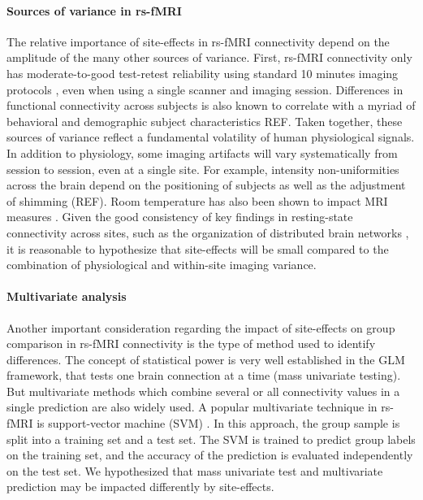 \documentclass[authoryear]{elsarticle}
\begin{document}
\paragraph{Sources of variance in rs-fMRI}
The relative importance of site-effects in rs-fMRI connectivity depend on the amplitude of the many other sources of variance. First, rs-fMRI connectivity only has moderate-to-good test-retest reliability using standard 10 minutes imaging protocols \citep{Shehzad2009}, even when using a single scanner and imaging session. Differences in functional connectivity across subjects is also known to correlate with a myriad of behavioral and demographic subject characteristics REF. Taken together, these sources of variance reflect a fundamental volatility of human physiological signals. In addition to physiology, some imaging artifacts will vary systematically from session to session, even at a single site. For example, intensity non-uniformities across the brain depend on the positioning of subjects as well as the adjustment of shimming (REF). Room temperature has also been shown to impact MRI measures \citep{Vanhoutte2006}. Given the good consistency of key findings in resting-state connectivity across sites, such as the organization of distributed brain networks \citep{Biswal2010}, it is reasonable to hypothesize that site-effects will be small compared to the combination of physiological and within-site imaging variance.

\paragraph{Multivariate analysis}
Another important consideration regarding the impact of site-effects on group comparison in rs-fMRI connectivity is the type of method used to identify differences. The concept of statistical power is very well established in the GLM framework, that tests one brain connection at a time (mass univariate testing). But multivariate methods which combine several or all connectivity values in a single prediction are also widely used. A popular multivariate technique in rs-fMRI is support-vector machine (SVM) \citep{Cortes1995}. In this approach, the group sample is split into a training set and a test set. The SVM is trained to predict group labels on the training set, and the accuracy of the prediction is evaluated independently on the test set. We hypothesized that mass univariate test and multivariate prediction may be impacted differently by site-effects. 
\end{document}
